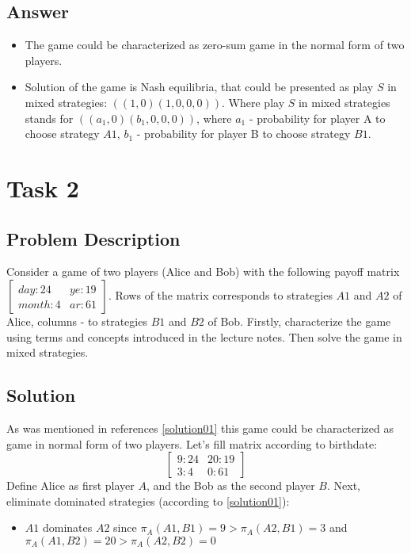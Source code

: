 \documentclass[
	a4paper, %
	11pt, %
]{CSUniSchoolLabReport}
\begin{document}
\subsection{Answer}\label{answer01}
\begin{itemize}
    \item The game could be characterized as zero-sum game in the normal form of two players.
    \item Solution of the game is Nash equilibria, that could be presented as play $S$ in mixed strategies: $((1, 0)(1, 0, 0, 0))$. Where play $S$ in mixed strategies stands for $((a_1, 0)(b_1, 0, 0, 0))$, where $a_1$ - probability for player A to choose strategy $A1$, $b_1$ - probability for player B to choose strategy $B1$.
\end{itemize}

\section{Task 2}

\subsection{Problem Description}\label{writeup02}
Consider a game of two players (Alice and Bob) with the following payoff matrix
$\begin{bmatrix}
    day:24 & ye:19 \\
    month:4 & ar:61
\end{bmatrix}
$. Rows of the matrix corresponds to strategies $A1$ and $A2$ of Alice, columns - to strategies $B1$ and $B2$ of Bob. Firstly, characterize the game using terms and concepts introduced in the lecture notes. Then solve the game in mixed strategies.

\subsection{Solution}\label{solution02}
As was mentioned in references \ref{solution01} this game could be characterized as game in normal form of two players. Let's fill matrix according to birthdate:
$$
\begin{bmatrix}
    9:24 & 20:19 \\
    3:4 & 0:61
\end{bmatrix}
$$
Define Alice as first player $A$, and the Bob as the second player $B$. Next, eliminate dominated strategies (according to \ref{solution01}):
\begin{itemize}
    \item $A1$ dominates $A2$ since $\pi_A(A1, B1) = 9 > \pi_A(A2, B1) = 3$ and $\pi_A(A1, B2) = 20 > \pi_A(A2, B2) = 0$
\end{itemize}\hspace{2pt}
\end{document}

